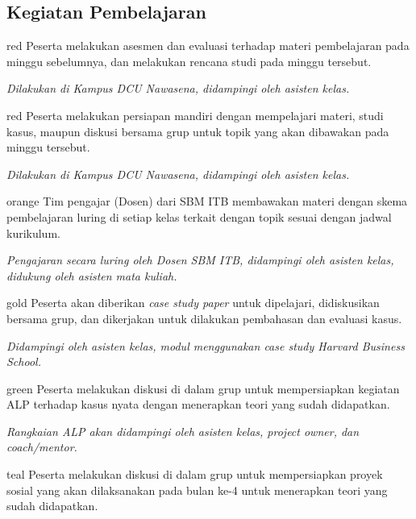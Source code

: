 \subsection{Kegiatan Pembelajaran}
\Needspace{11cm}
\begin{tcbraster}[raster columns=4,raster equal height=rows,raster column skip=2mm,raster row skip=2mm]
\begin{infobox}{red}
Peserta melakukan asesmen dan evaluasi terhadap materi pembelajaran pada minggu sebelumnya, dan melakukan rencana studi pada minggu tersebut.

\textit{Dilakukan di Kampus DCU Nawasena, didampingi oleh asisten kelas.}
\end{infobox}
\begin{infobox}{red}
Peserta melakukan persiapan mandiri dengan mempelajari materi, studi kasus, maupun diskusi bersama grup untuk topik yang akan dibawakan pada minggu tersebut.

\textit{Dilakukan di Kampus DCU Nawasena, didampingi oleh asisten kelas.}
\end{infobox}
\begin{infobox}[Lecturing]{orange}
Tim pengajar (Dosen) dari SBM ITB membawakan materi dengan skema pembelajaran luring di setiap kelas terkait dengan topik sesuai dengan jadwal kurikulum.

\textit{Pengajaran secara luring oleh Dosen SBM ITB, didampingi oleh asisten kelas, didukung oleh asisten mata kuliah.}
\end{infobox}
\begin{infobox}{gold}
Peserta akan diberikan \textit{case study paper} untuk dipelajari, didiskusikan bersama grup, dan dikerjakan untuk dilakukan pembahasan dan evaluasi kasus.

\textit{Didampingi oleh asisten kelas, modul menggunakan case study Harvard Business School.}
\end{infobox}
\begin{infobox}{green}
Peserta melakukan diskusi di dalam grup untuk mempersiapkan kegiatan ALP terhadap kasus nyata dengan menerapkan teori yang sudah didapatkan.

\textit{Rangkaian ALP akan didampingi oleh asisten kelas, project owner, dan coach/mentor.}
\end{infobox}
\begin{infobox}{teal}
Peserta melakukan diskusi di dalam grup untuk mempersiapkan proyek sosial yang akan dilaksanakan pada bulan ke-4 untuk menerapkan teori yang sudah didapatkan.


\end{infobox}
\end{tcbraster}
